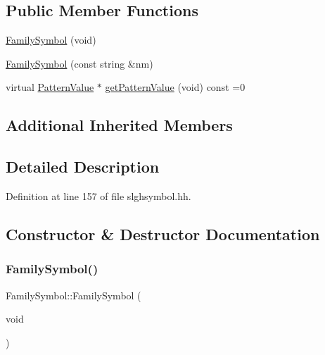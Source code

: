 \subsection*{Public Member Functions}
\begin{DoxyCompactItemize}
\item 
\mbox{\hyperlink{class_family_symbol_a1d455147bceed6a6a622b7bc54cacf65}{Family\+Symbol}} (void)
\item 
\mbox{\hyperlink{class_family_symbol_a8bf641754f7706d9b5facb5d5a7f760b}{Family\+Symbol}} (const string \&nm)
\item 
virtual \mbox{\hyperlink{class_pattern_value}{Pattern\+Value}} $\ast$ \mbox{\hyperlink{class_family_symbol_a4918a769969008aeaa7a5cbe0eff90ac}{get\+Pattern\+Value}} (void) const =0
\end{DoxyCompactItemize}
\subsection*{Additional Inherited Members}


\subsection{Detailed Description}


Definition at line 157 of file slghsymbol.\+hh.



\subsection{Constructor \& Destructor Documentation}
\mbox{\label{class_family_symbol_a1d455147bceed6a6a622b7bc54cacf65}} 
\subsubsection{\texorpdfstring{FamilySymbol()}{FamilySymbol()}\hspace{0.1cm}{\footnotesize\ttfamily [1/2]}}
{\footnotesize\ttfamily Family\+Symbol\+::\+Family\+Symbol (\begin{DoxyParamCaption}\item[{void}]{ }\end{DoxyParamCaption})\hspace{0.3cm}{\ttfamily [inline]}}




